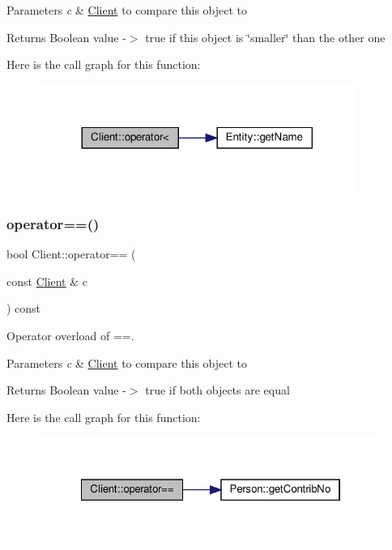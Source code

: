 \begin{DoxyParams}{Parameters}
{\em c} & \hyperlink{classClient}{Client} to compare this object to\\
\hline
\end{DoxyParams}
\begin{DoxyReturn}{Returns}
Boolean value -\/$>$ true if this object is \char`\"{}smaller\char`\"{} than the other one 
\end{DoxyReturn}
Here is the call graph for this function\+:\nopagebreak
\begin{figure}[H]
\begin{center}
\leavevmode
\includegraphics[width=293pt]{classClient_ada079699bae9cf8b0b729c82f0940487_cgraph}
\end{center}
\end{figure}
\mbox{\label{classClient_a7dfa59dc82c7ef516edc0eb6719b97f0}} 
\subsubsection{\texorpdfstring{operator==()}{operator==()}}
{\footnotesize\ttfamily bool Client\+::operator== (\begin{DoxyParamCaption}\item[{const \hyperlink{classClient}{Client} \&}]{c }\end{DoxyParamCaption}) const}



Operator overload of ==. 


\begin{DoxyParams}{Parameters}
{\em c} & \hyperlink{classClient}{Client} to compare this object to\\
\hline
\end{DoxyParams}
\begin{DoxyReturn}{Returns}
Boolean value -\/$>$ true if both objects are equal 
\end{DoxyReturn}
Here is the call graph for this function\+:\nopagebreak
\begin{figure}[H]
\begin{center}
\leavevmode
\includegraphics[width=322pt]{classClient_a7dfa59dc82c7ef516edc0eb6719b97f0_cgraph}
\end{center}
\end{figure}


